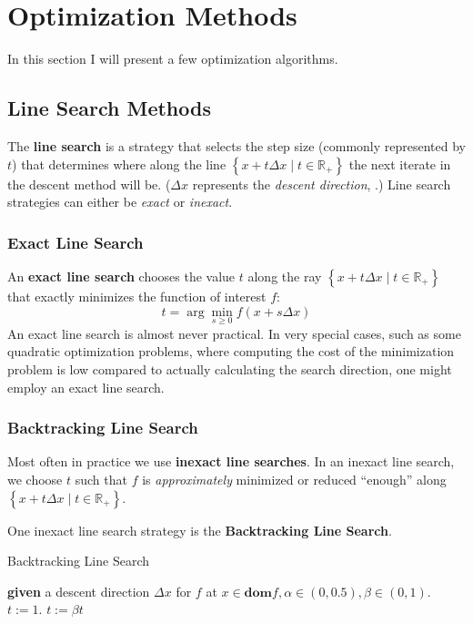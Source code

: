 \section{Optimization Methods}

In this section I will present a few optimization algorithms.

\subsection{Line Search Methods}

The {\color{tiananmen}\textbf{line search}} is a strategy that selects the step size (commonly represented by $t$) that determines where along the line $\left\lbrace x+t\Delta x\mid t\in\mathbb{R}_+\right\rbrace$ the next iterate in the descent method will be. ($\Delta x$ represents the \textit{descent direction}, .) Line search strategies can either be \textit{exact} or \textit{inexact}.

\subsubsection*{Exact Line Search}

An {\color{tiananmen}\textbf{exact line search}} chooses the value $t$ along the ray $\left\lbrace x+t\Delta x\mid t\in\mathbb{R}_+\right\rbrace$ that exactly minimizes the function of interest $f$:
{\color{baystate}$$t=\arg\min_{s\geq 0}f(x+s\Delta x)$$}
An exact line search is almost never practical. In very special cases, such as some quadratic optimization problems, where computing the cost of the minimization problem is low compared to actually calculating the search direction, one might employ an exact line search.

\subsubsection*{Backtracking Line Search}
Most often in practice we use {\color{tiananmen}\textbf{inexact line searches}}. In an inexact line search, we choose $t$ such that $f$ is \textit{approximately} minimized or reduced ``enough'' along $\left\lbrace x+t\Delta x\mid t\in\mathbb{R}_+\right\rbrace$.

One inexact line search strategy is the {\color{tiananmen}\textbf{Backtracking Line Search}}.
\begin{algorithm}[H]
	\caption{Backtracking Line Search \cite[]{Boyd2004}\label{BacktrackingLineSearchAlg}}
	\begin{algorithmic} 
		\State \textbf{given} a descent direction $\Delta x$ for $f$ at $x\in\textbf{dom}f,\alpha\in(0,0.5),\beta\in(0,1)$.
		\State $t:=1$.
		\State $t:=\beta t$
		\EndWhile
	\end{algorithmic}
\end{algorithm}

